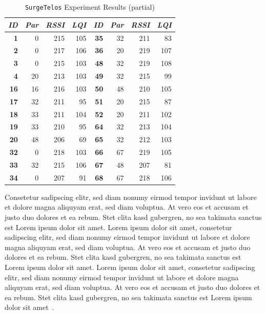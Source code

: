 \begin{table}
\begin{center}
\begin{tabular}{|r|r|r|r||r|r|r|r|}
\hline \textbf{\textit{ID}} & \textbf{\textit{Par}} & \textbf{\textit{RSSI}} &
\textbf{\textit{LQI}} &
\textbf{\textit{ID}} & \textbf{\textit{Par}} & \textbf{\textit{RSSI}} & \textbf{\textit{LQI}} \\
\hline \hline
\textbf{1}  &  0 & 215 & 105 & \textbf{35} & 32 & 211 &  83 \\
\textbf{2}  &  0 & 217 & 106 & \textbf{36} & 20 & 219 & 107 \\
\textbf{3}  &  0 & 215 & 103 & \textbf{48} & 32 & 219 & 108 \\
\textbf{4}  & 20 & 213 & 103 & \textbf{49} & 32 & 215 &  99 \\
\textbf{16} & 16 & 216 & 103 & \textbf{50} & 48 & 210 & 105 \\
\textbf{17} & 32 & 211 &  95 & \textbf{51} & 20 & 215 &  87 \\
\textbf{18} & 33 & 211 & 104 & \textbf{52} & 20 & 211 & 102 \\
\textbf{19} & 33 & 210 &  95 & \textbf{64} & 32 & 213 & 104 \\
\textbf{20} & 48 & 206 &  69 & \textbf{65} & 32 & 212 & 103 \\
\textbf{32} &  0 & 218 & 103 & \textbf{66} & 67 & 219 & 105 \\
\textbf{33} & 32 & 215 & 106 & \textbf{67} & 48 & 207 &  81 \\
\textbf{34} &  0 & 207 &  91 & \textbf{68} & 67 & 218 & 106 \\
\hline
\end{tabular}
\caption{\texttt{SurgeTelos} Experiment Results (partial)} \label{tbl:experiment_table}
\end{center}
\end{table}

Consetetur sadipscing elitr,  sed diam nonumy eirmod tempor invidunt ut labore
et dolore magna aliquyam erat, sed diam voluptua. At vero eos et accusam et
justo duo dolores et ea rebum. Stet clita kasd gubergren, no sea takimata
sanctus est Lorem ipsum dolor sit amet. Lorem ipsum dolor sit amet, consetetur
sadipscing elitr,  sed diam nonumy eirmod tempor invidunt ut labore et dolore
magna aliquyam erat, sed diam voluptua. At vero eos et accusam et justo duo
dolores et ea rebum. Stet clita kasd gubergren, no sea takimata sanctus est
Lorem ipsum dolor sit amet. Lorem ipsum dolor sit amet, consetetur sadipscing
elitr,  sed diam nonumy eirmod tempor invidunt ut labore et dolore magna
aliquyam erat, sed diam voluptua. At vero eos et accusam et justo duo dolores
et ea rebum. Stet clita kasd gubergren, no sea takimata sanctus est Lorem ipsum
dolor sit amet~\cite{chun:mum}.

